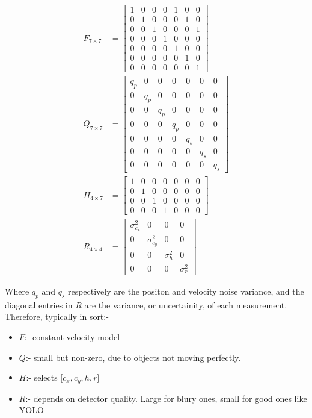 \documentclass[10pt]{article}
\begin{document}
    \begin{align*}
        F_{7\times7} &= \begin{bmatrix}
            1 & 0 & 0 & 0 & 1 & 0 & 0 \\
            0 & 1 & 0 & 0 & 0 & 1 & 0 \\
            0 & 0 & 1 & 0 & 0 & 0 & 1 \\
            0 & 0 & 0 & 1 & 0 & 0 & 0 \\
            0 & 0 & 0 & 0 & 1 & 0 & 0 \\
            0 & 0 & 0 & 0 & 0 & 1 & 0 \\
            0 & 0 & 0 & 0 & 0 & 0 & 1 
        \end{bmatrix} \\
        Q_{7 \times 7} &= \begin{bmatrix}
            q_p & 0 & 0 & 0 & 0 & 0 & 0 \\
            0 & q_p & 0 & 0 & 0 & 0 & 0 \\
            0 & 0 & q_p & 0 & 0 & 0 & 0 \\
            0 & 0 & 0 & q_p & 0 & 0 & 0 \\
            0 & 0 & 0 & 0 & q_s & 0 & 0 \\
            0 & 0 & 0 & 0 & 0 & q_s & 0 \\
            0 & 0 & 0 & 0 & 0 & 0 & q_s
        \end{bmatrix} \\
        H_{4 \times 7} &= \begin{bmatrix}
            1 & 0 & 0 & 0 & 0 & 0 & 0 \\
            0 & 1 & 0 & 0 & 0 & 0 & 0 \\
            0 & 0 & 1 & 0 & 0 & 0 & 0 \\
            0 & 0 & 0 & 1 & 0 & 0 & 0 
        \end{bmatrix} \\
        R_{4 \times 4} &= \begin{bmatrix}
            \sigma^2_{c_x} & 0 & 0 & 0 \\
            0 & \sigma^2_{c_y} & 0 & 0 \\
            0 & 0 & \sigma^2_h & 0 \\
            0 & 0 & 0 & \sigma^2_r
        \end{bmatrix}
    \end{align*}

    \noindent Where \(q_p\) and \(q_s\) respectively are the positon and velocity noise variance, and the diagonal entries in \(R\) are the variance, or 
    uncertainity, of each measurement. Therefore, typically in sort:-
    \begin{itemize}
        \item \(F\):- constant velocity model
        \item \(Q\):- small but non-zero, due to objects not moving perfectly.
        \item \(H\):- selects [\(c_x, c_y, h, r\)]
        \item \(R\):- depends on detector quality. Large for blury ones, small for good ones like YOLO
    \end{itemize}
\end{document}
